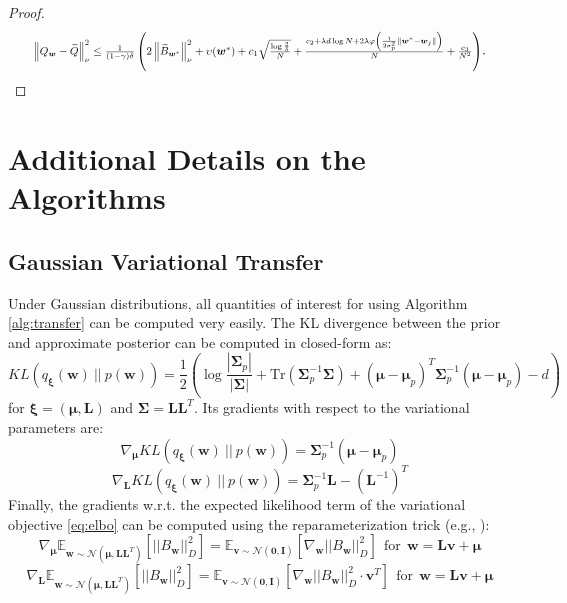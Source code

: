 \documentclass{article}
\newcommand{\wt}[1]{\widetilde{#1}}
\newcommand{\norm}[1]{\left\lVert #1 \right\rVert}
\begin{document}
\begin{proof}
\begin{align*}
\resizebox{0.93\textwidth}{!}{$
\norm{Q_{\bm{w}} - \wt{Q}}_{\nu}^2 \leq \frac{1}{(1-\gamma)\delta}\left(2\norm{\wt{B}_{\bm{w}^{*}}}_{\nu}^2 + \upsilon(\bm{w}^*) + c_1\sqrt{\frac{\log\frac{2}{\delta}}{N}}  + \frac{c_2 + \lambda d \log N + 2\lambda\varphi\left(\frac{1}{2\sigma^2_p}\norm{\bm{w}^* - \bm{w}_j}\right)}{N} + \frac{c_3}{N^2}\right)$}.
\end{align*}
\end{proof}

\section{Additional Details on the Algorithms}

\subsection{Gaussian Variational Transfer}

Under Gaussian distributions, all quantities of interest for using Algorithm \ref{alg:transfer} can be computed very easily. The KL divergence between the prior and approximate posterior can be computed in closed-form as:
\begin{equation}
KL\left(q_{\bm{\xi}}(\bm{w})\ ||\ p(\bm{w})\right) = \frac{1}{2}\left( \log\frac{\left\lvert \bm{\Sigma}_p \right\rvert}{\left\lvert \bm{\Sigma} \right\rvert} + \text{Tr}\left( \bm{\Sigma}_p^{-1}\bm{\Sigma} \right) + (\bm{\mu} - \bm{\mu}_p)^T \bm{\Sigma}_p^{-1} (\bm{\mu} - \bm{\mu}_p) -d \right)
\end{equation}
for $\bm{\xi} = (\bm{\mu},\bm{L})$ and $\bm{\Sigma} = \bm{LL}^T$. Its gradients with respect to the variational parameters are:
\begin{equation}\label{eq:klgradmu}
\nabla_{\bm{\mu}} KL\left(q_{\bm{\xi}}(\bm{w})\ ||\ p(\bm{w})\right) = \bm{\Sigma}_p^{-1} (\bm{\mu} - \bm{\mu}_p)
\end{equation}
\begin{equation}\label{eq:klgradL}
\nabla_{\bm{L}} KL\left(q_{\bm{\xi}}(\bm{w})\ ||\ p(\bm{w})\right) = \bm{\Sigma}_p^{-1}\bm{L} - (\bm{L}^{-1})^T 
\end{equation}
Finally, the gradients w.r.t. the expected likelihood term of the variational objective \eqref{eq:elbo} can be computed using the reparameterization trick (e.g., \cite{hoffman2013stochastic,rezende2014stochastic}):
\begin{equation}\label{eq:tdgradmu}
\nabla_{\bm{\mu}} \mathbb{E}_{\bm{w} \sim \mathcal{N}(\bm{\mu},\bm{LL}^T)}\left[ ||B_{\bm{w}}||_{D}^2 \right] = \mathbb{E}_{\bm{v} \sim \mathcal{N}(\bm{0},\bm{I})}\left[ \nabla_{\bm{w}} ||B_{\bm{w}}||_{D}^2 \right]\ \ \text{for}\ \ \bm{w} = \bm{Lv} + \bm{\mu}
\end{equation} 
\begin{equation}\label{eq:tdgradL}
\nabla_{\bm{L}} \mathbb{E}_{\bm{w} \sim \mathcal{N}(\bm{\mu},\bm{LL}^T)}\left[ ||B_{\bm{w}}||_{D}^2 \right] = \mathbb{E}_{\bm{v} \sim \mathcal{N}(\bm{0},\bm{I})}\left[ \nabla_{\bm{w}} ||B_{\bm{w}}||_{D}^2 \cdot \bm{v}^T \right]\ \ \text{for}\ \ \bm{w} = \bm{Lv} + \bm{\mu}
\end{equation}
\end{document}
